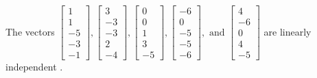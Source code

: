 \begin{exercise}
\begin{exerciseStatement}
  \end{exerciseStatement}
  \begin{exerciseAnswer}
   The vectors \(\left[\begin{array}{r}
1 \\
1 \\
-5 \\
-3 \\
-1
\end{array}\right] , \left[\begin{array}{r}
3 \\
-3 \\
-3 \\
2 \\
-4
\end{array}\right] , \left[\begin{array}{r}
0 \\
0 \\
1 \\
3 \\
-5
\end{array}\right] , \left[\begin{array}{r}
-6 \\
0 \\
-5 \\
-5 \\
-6
\end{array}\right] , \text{ and } \left[\begin{array}{r}
4 \\
-6 \\
0 \\
4 \\
-5
\end{array}\right]\) are 
  	 linearly independent  .
  


  \end{exerciseAnswer}
\end{exercise}